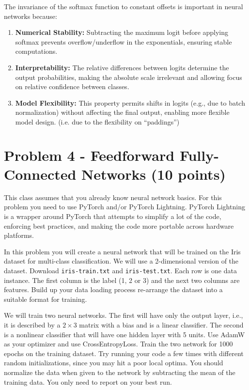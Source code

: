 \documentclass[11pt, oneside]{article}   	%
\begin{document}
The invariance of the softmax function to constant offsets is important in neural networks because:
\\
\begin{enumerate}
    \item \textbf{Numerical Stability:} Subtracting the maximum logit before applying softmax prevents overflow/underflow in the exponentials, ensuring stable computations.
    \item \textbf{Interpretability:} The relative differences between logits determine the output probabilities, making the absolute scale irrelevant and allowing focus on relative confidence between classes.
    \item \textbf{Model Flexibility:} This property permits shifts in logits (e.g., due to batch normalization) without affecting the final output, enabling more flexible model design. (i.e. due to the flexibility on ``paddings'')
\end{enumerate}

\newpage


\section*{Problem 4 - Feedforward Fully-Connected Networks (10 points)}
This class assumes that you already know neural network basics. For this problem you need to use PyTorch and/or PyTorch Lightning. PyTorch Lightning is a wrapper around PyTorch that attempts to simplify a lot of the code, enforcing best practices, and making the code more portable across hardware platforms.

In this problem you will create a neural network that will be trained on the Iris dataset for multi-class classification. We will use a 2-dimensional version of the dataset. Download \texttt{iris-train.txt} and \texttt{iris-test.txt}. Each row is one data instance. The first column is the label (1, 2 or 3) and the next two columns are features. Build up your data loading process re-arrange the dataset into a suitable format for training. 

We will train two neural networks. The first will have only the output layer, i.e., it is described by a $2 \times 3$ matrix with a bias and is a linear classifier. The second is a nonlinear classifier that will have one hidden layer with 5 units.  Use AdamW as your optimizer and use CrossEntropyLoss. Train the two network for 1000 epochs on the training dataset. Try running your code a few times with different random initializations, since you may hit a poor local optima. You should normalize the data when given to the network by subtracting the mean of the training data. You only need to report on your best run.
\end{document}
